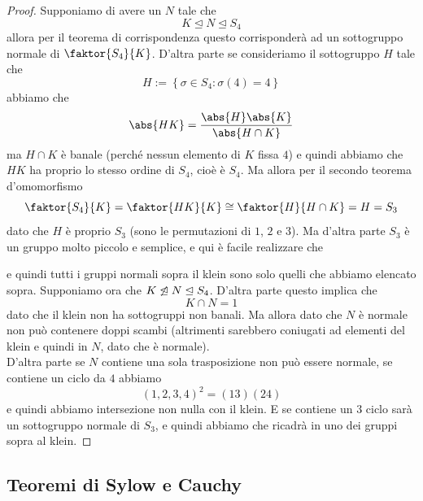 \documentclass[11pt]{scrartcl}
\newcommand{\normal}{\mathrel{\unlhd}}
\begin{document}
	 \begin{proof}
	 	Supponiamo di avere un $N$ tale che
	 	$$K\normal N \normal S_4$$
	 	allora per il teorema di corrispondenza questo corrisponderà ad un sottogruppo normale di $\faktor{S_4}{K}$. D'altra parte se consideriamo il sottogruppo $H$ tale che
	 	$$H:=\left\{\sigma\in S_4:\sigma(4)=4\right\}$$
	 	abbiamo che 
	 	$$\abs{HK}=\frac{\abs{H}\abs{K}}{\abs{H\cap K}}$$
	 	ma $H\cap K$ è banale (perché nessun elemento di $K$ fissa $4$) e quindi abbiamo che $HK$ ha proprio lo stesso ordine di $S_4$, cioè è $S_4$. Ma allora per il secondo teorema d'omomorfismo
	 	$$\faktor{S_4}{K}=\faktor{HK}{K}\cong \faktor{H}{H\cap K}=H=S_3$$
	 	dato che $H$ è proprio $S_3$ (sono le permutazioni di $1$, $2$ e $3$). Ma d'altra parte $S_3$ è un gruppo molto piccolo e semplice, e qui è facile realizzare che 
	 	\begin{center}
	 	\end{center}
	 	e quindi tutti i gruppi normali sopra il klein sono solo quelli che abbiamo elencato sopra. Supponiamo ora che $K\not\normal N\normal S_4$. D'altra parte questo implica che
	 	$$K\cap N=1$$
	 	dato che il klein non ha sottogruppi non banali. Ma allora dato che $N$ è normale non può contenere doppi scambi (altrimenti sarebbero coniugati ad elementi del klein e quindi in $N$, dato che è normale). \\
	 	D'altra parte se $N$ contiene una sola trasposizione non può essere normale, se contiene un ciclo da $4$ abbiamo
	 	$$(1,2,3,4)^2=(13)(24)$$
	 	e quindi abbiamo intersezione non nulla con il klein. E se contiene un $3$ ciclo sarà un sottogruppo normale di $S_3$, e quindi abbiamo che ricadrà in uno dei gruppi sopra al klein.
	 \end{proof}
	 
	 \subsection{Teoremi di Sylow e Cauchy}
	 
\end{document}
